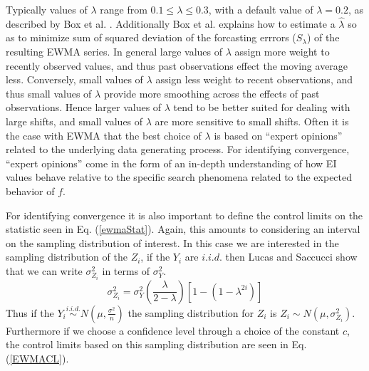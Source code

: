 \documentclass[12pt]{article}
\newcommand{\E}[1]{
        \mathbb{E}\left[~#1~\right]
}
\def \ix {
	\text{I}(\bm{x})
}
\begin{document}
	Typically values of $\lambda$ range from $0.1\le\lambda\le0.3$, with a default value of $\lambda=0.2$, as described by Box et al. \cite{boxBook}.
	Additionally Box et al. explains how to estimate a $\hat\lambda$ so as to minimize sum of squared deviation of the forcasting errrors ($S_\lambda$) of the resulting EWMA series. %
	In general large values of $\lambda$ assign more weight to recently observed values, and thus past observations effect the moving average less. %
	Conversely, small values of $\lambda$ assign less weight to recent observations, and thus small values of $\lambda$ provide more smoothing across the effects of past observations. 
	Hence larger values of $\lambda$ tend to be better suited for dealing with large shifts, and small values of $\lambda$ are more sensitive to small shifts.
	Often it is the case with EWMA that the best choice of $\lambda$ is based on ``expert opinions'' related to the underlying data generating process.
	For identifying convergence, ``expert opinions'' come in the form of an in-depth understanding of how EI values behave relative to the specific search phenomena related to the expected behavior of $f$.
	
	
	
	For identifying convergence it is also important to define the control limits on the statistic seen in Eq. (\ref{ewmaStat}).
	Again, this amounts to considering an interval on the sampling distribution of interest.
	In this case we are interested in the sampling distribution of the $Z_i$, if the $Y_i$ are $i.i.d.$ then Lucas and Saccucci \cite{ewmaPaper}  show that we can write $\sigma^2_{Z_i}$ in terms of $\sigma^2_{Y}$. %
	\begin{equation}
	\sigma^2_{Z_i} = \sigma^2_{Y}\left(\frac{\lambda}{2-\lambda}\right)\left[1-(1-\lambda^{2i})\right]
	\end{equation}
	Thus if the $Y_i \stackrel{i.i.d.}{\sim} N\left(\mu, \frac{\sigma^2}{n}\right)$ the sampling distribution for $Z_i$ is $Z_i \sim N\left(\mu, \sigma^2_{Z_i}\right)$.
	Furthermore if we choose a confidence level through a choice of the constant $c$, the control limits based on this sampling distribution are seen in Eq. (\ref{EWMACL}).%
	
\end{document}
